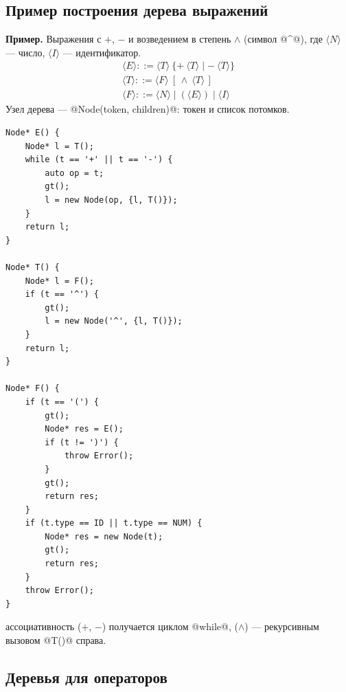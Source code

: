 \documentclass[11pt,a4paper]{article}
\begin{document}
\subsection{Пример построения дерева выражений}

\textbf{Пример.} Выражения с $+$, $-$ и возведением в степень $\wedge$ (символ @^@), где $\langle N\rangle$ — число, $\langle I\rangle$ — идентификатор.
\[
\begin{array}{l}
\langle E\rangle::=\langle T\rangle\ \{+\ \langle T\rangle\mid-\ \langle T\rangle\}\\
\langle T\rangle::=\langle F\rangle\ [\,\wedge\ \langle T\rangle\,]\\
\langle F\rangle::=\langle N\rangle\mid(\langle E\rangle)\mid\langle I\rangle
\end{array}
\]
Узел дерева — @Node(token, {children})@: токен и список потомков.

\begin{lstlisting}
Node* E() {
    Node* l = T();
    while (t == '+' || t == '-') {
        auto op = t;
        gt();
        l = new Node(op, {l, T()});
    }
    return l;
}

Node* T() {
    Node* l = F();
    if (t == '^') {
        gt();
        l = new Node('^', {l, T()});
    }
    return l;
}

Node* F() {
    if (t == '(') {
        gt();
        Node* res = E();
        if (t != ')') {
            throw Error();
        }
        gt();
        return res;
    }
    if (t.type == ID || t.type == NUM) {
        Node* res = new Node(t);
        gt();
        return res;
    }
    throw Error();
}
\end{lstlisting}

\begin{zam}
 ассоциативность ($+$, $-$) получается циклом @while@,  ($\wedge$) — рекурсивным вызовом @T()@ справа.
\end{zam}

\subsection{Деревья для операторов}

\end{document}
